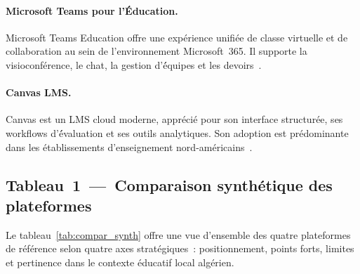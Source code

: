 \documentclass[12pt,a4paper,oneside]{report}
\begin{document}
\paragraph{Microsoft Teams pour l'\'Education.}
Microsoft Teams Education offre une exp\'erience unifi\'ee de classe virtuelle et de collaboration au sein de l'environnement Microsoft~365. Il supporte la visioconf\'erence, le chat, la gestion d'\'équipes et les devoirs~\cite{microsoft_teams_edu_2026}.

\paragraph{Canvas LMS.}
Canvas est un LMS cloud moderne, appr\'eci\'e pour son interface structur\'ee, ses workflows d'\'évaluation et ses outils analytiques. Son adoption est pr\'edominante dans les établissements d'enseignement nord-am\'ericains~\cite{canvas_overview_2026}.

\subsection{Tableau~1~---~Comparaison synth\'etique des plateformes}

Le tableau~\ref{tab:compar_synth} offre une vue d'ensemble des quatre plateformes de r\'ef\'erence selon quatre axes strat\'egiques~: positionnement, points forts, limites et pertinence dans le contexte éducatif local algérien.
\end{document}
